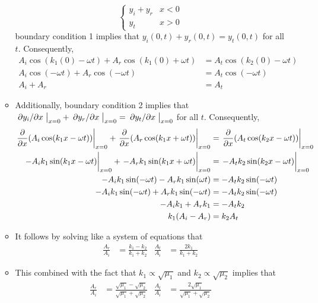 \documentclass[../notes.tex]{subfiles}
\begin{document}
\begin{itemize}
\begin{itemize}
\begin{equation*}
\begin{cases}
                y_i+y_r & x<0\\
                y_t & x>0
            \end{cases}
        \end{equation*}
        boundary condition 1 implies that $y_i(0,t)+y_r(0,t)=y_t(0,t)$ for all $t$. Consequently,
        \begin{align*}
            A_i\cos(k_1(0)-\omega t)+A_r\cos(k_1(0)+\omega t) &= A_t\cos(k_2(0)-\omega t)\\
            A_i\cos(-\omega t)+A_r\cos(-\omega t) &= A_t\cos(-\omega t)\\
            A_i+A_r &= A_t
        \end{align*}
        \item Additionally, boundary condition 2 implies that $\eval{\pdv*{y_i}{x}}_{x=0}+\eval{\pdv*{y_r}{x}}_{x=0}=\eval{\pdv*{y_t}{x}}_{x=0}$ for all $t$. Consequently,
        \begin{align*}
            \eval{\pdv{x}(A_i\cos(k_1x-\omega t))}_{x=0}+\eval{\pdv{x}(A_r\cos(k_1x+\omega t))}_{x=0} &= \eval{\pdv{x}(A_t\cos(k_2x-\omega t))}_{x=0}\\
            \eval{-A_ik_1\sin(k_1x-\omega t)}_{x=0}+\eval{-A_rk_1\sin(k_1x+\omega t)}_{x=0} &= \eval{-A_tk_2\sin(k_2x-\omega t)}_{x=0}\\
            -A_ik_1\sin(-\omega t)-A_rk_1\sin(\omega t) &= -A_tk_2\sin(-\omega t)\\
            -A_ik_1\sin(-\omega t)+A_rk_1\sin(-\omega t) &= -A_tk_2\sin(-\omega t)\\
            -A_ik_1+A_rk_1 &= -A_tk_2\\
            k_1(A_i-A_r) &= k_2A_t
        \end{align*}
        \item It follows by solving like a system of equations that
        \begin{align*}
            \frac{A_r}{A_i} &= \frac{k_1-k_2}{k_1+k_2}&
            \frac{A_t}{A_i} &= \frac{2k_1}{k_1+k_2}
        \end{align*}
        \item This combined with the fact that $k_1\propto\sqrt{\mu_1}$ and $k_2\propto\sqrt{\mu_2}$ implies that
        \begin{align*}
            \frac{A_r}{A_i} &= \frac{\sqrt{\mu_1}-\sqrt{\mu_2}}{\sqrt{\mu_1}+\sqrt{\mu_2}}&
            \frac{A_t}{A_i} &= \frac{2\sqrt{\mu_1}}{\sqrt{\mu_1}+\sqrt{\mu_2}}
        \end{align*}
    \end{itemize}

\end{itemize}
\end{document}
